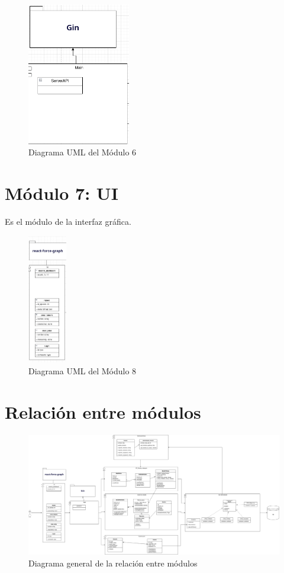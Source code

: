 \documentclass{report}
\begin{document}
\begin{figure}[H]
    \centering
    \includegraphics[width=0.4\textwidth]{./Diagramas/Modulo7.png}
    \caption{Diagrama UML del Módulo 6}
\end{figure}

\section{Módulo 7: UI}
Es el módulo de la interfaz gráfica.

\begin{figure}[H]
    \centering
    \includegraphics[width=0.15\textwidth]{./Diagramas/Modulo8.png}
    \caption{Diagrama UML del Módulo 8}
\end{figure}
\section{Relación entre módulos}

\begin{figure}[H]
    \centering
    \includegraphics[width=1.55\textwidth, angle=270]{./Diagramas/Diagrama-Modulos.png}
    \caption{Diagrama general de la relación entre módulos}
\end{figure}
\end{document}
